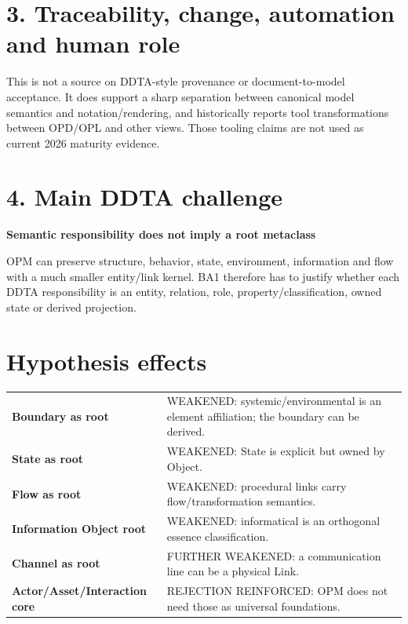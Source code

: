 \documentclass[10pt,a4paper]{article}
\newenvironment{challenge}[1]{\def\FrameCommand{\fcolorbox{ddtaorange}{ddtagray}}\MakeFramed{\advance\hsize-2\width\FrameRestore}\noindent\textbf{#1}\par\smallskip}{\endMakeFramed}
\begin{document}
\section{3. Traceability, change, automation and human role}
This is not a source on DDTA-style provenance or document-to-model acceptance. It does support a sharp separation between canonical model semantics and notation/rendering, and historically reports tool transformations between OPD/OPL and other views. Those tooling claims are not used as current 2026 maturity evidence.

\section{4. Main DDTA challenge}
\begin{challenge}{Semantic responsibility does not imply a root metaclass}
OPM can preserve structure, behavior, state, environment, information and flow with a much smaller entity/link kernel. BA1 therefore has to justify whether each DDTA responsibility is an entity, relation, role, property/classification, owned state or derived projection.
\end{challenge}

\section{Hypothesis effects}
\begin{tabularx}{\linewidth}{>{\bfseries}p{4.1cm}X}
Boundary as root & WEAKENED: systemic/environmental is an element affiliation; the boundary can be derived.\\
State as root & WEAKENED: State is explicit but owned by Object.\\
Flow as root & WEAKENED: procedural links carry flow/transformation semantics.\\
Information Object root & WEAKENED: informatical is an orthogonal essence classification.\\
Channel as root & FURTHER WEAKENED: a communication line can be a physical Link.\\
Actor/Asset/Interaction core & REJECTION REINFORCED: OPM does not need those as universal foundations.\\
\end{tabularx}
\end{document}
